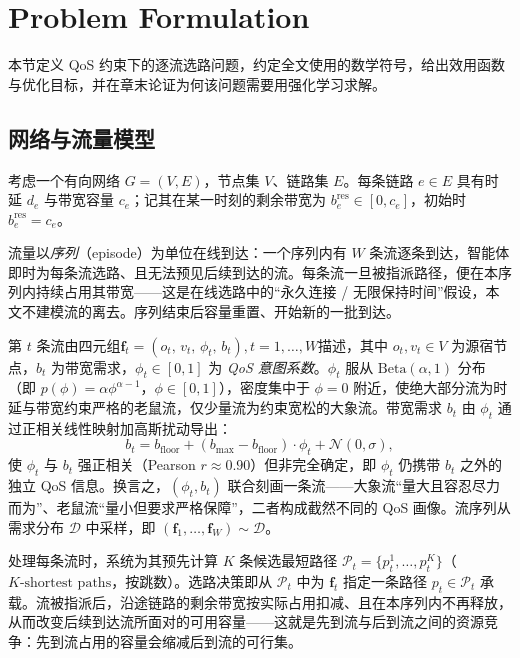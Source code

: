 \section{Problem Formulation}
\label{sec:problem}

本节定义 QoS 约束下的逐流选路问题，约定全文使用的数学符号，给出效用函数与优化目标，并在章末论证为何该问题需要用强化学习求解。

\subsection{网络与流量模型}
\label{sec:problem:model}

考虑一个有向网络 $G=(V,E)$，节点集 $V$、链路集 $E$。每条链路 $e\in E$ 具有时延 $d_e$ 与带宽容量 $c_e$；记其在某一时刻的剩余带宽为 $b_e^{\text{res}}\in[0,c_e]$，初始时 $b_e^{\text{res}}=c_e$。

流量以\emph{序列}（episode）为单位在线到达：一个序列内有 $W$ 条流逐条到达，智能体即时为每条流选路、且无法预见后续到达的流。每条流一旦被指派路径，便在本序列内持续占用其带宽——这是在线选路中的``永久连接 / 无限保持时间''假设，本文不建模流的离去。序列结束后容量重置、开始新的一批到达。

第 $t$ 条流由四元组$\mathbf{f}_t = (o_t,\, v_t,\, \phi_t,\, b_t), t=1,\dots,W $描述，其中 $o_t,v_t\in V$ 为源宿节点，$b_t$ 为带宽需求，$\phi_t\in[0,1]$ 为 \emph{QoS 意图系数}。$\phi_t$ 服从 $\text{Beta}(\alpha, 1)$ 分布（即 $p(\phi)=\alpha\phi^{\alpha-1}$，$\phi\in[0,1]$），密度集中于 $\phi=0$ 附近，使绝大部分流为时延与带宽约束严格的老鼠流，仅少量流为约束宽松的大象流。带宽需求 $b_t$ 由 $\phi_t$ 通过正相关线性映射加高斯扰动导出：
\begin{equation}
b_t = b_{\text{floor}} + (b_{\text{max}}-b_{\text{floor}})\cdot\phi_t + \mathcal{N}(0,\sigma),
\label{eq:bw_gen}
\end{equation}
使 $\phi_t$ 与 $b_t$ 强正相关（Pearson $r\approx 0.90$）但非完全确定，即 $\phi_t$ 仍携带 $b_t$ 之外的独立 QoS 信息。换言之，$(\phi_t, b_t)$ 联合刻画一条流——大象流``量大且容忍尽力而为''、老鼠流``量小但要求严格保障''，二者构成截然不同的 QoS 画像。流序列从需求分布 $\mathcal{D}$ 中采样，即 $(\mathbf{f}_1,\dots,\mathbf{f}_W)\sim\mathcal{D}$。

处理每条流时，系统为其预先计算 $K$ 条候选最短路径 $\mathcal{P}_t=\{p_t^{1},\dots,p_t^{K}\}$（$K\text{-shortest paths}$，按跳数）。选路决策即从 $\mathcal{P}_t$ 中为 $\mathbf{f}_t$ 指定一条路径 $p_t\in\mathcal{P}_t$ 承载。流被指派后，沿途链路的剩余带宽按实际占用扣减、且在本序列内不再释放，从而改变后续到达流所面对的可用容量——这就是先到流与后到流之间的资源竞争：先到流占用的容量会缩减后到流的可行集。

